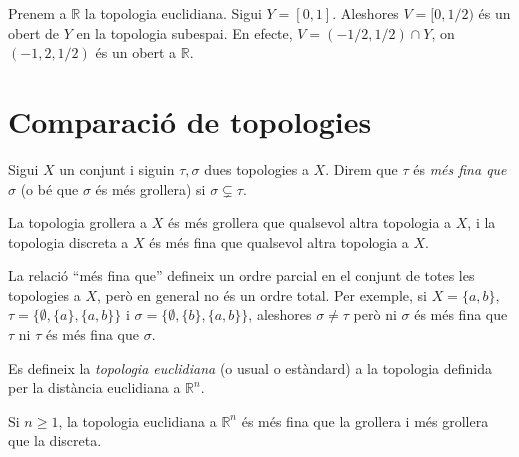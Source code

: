 \documentclass[../main.tex]{subfiles}
\begin{document}
\begin{ej}
\label{ej:topologiasubespai3} Prenem a $\mathbb{R}$ la topologia euclidiana. Sigui $Y = [0,1]$. Aleshores $V = [0,1/2)$ és un obert de $Y$ en la topologia subespai. En efecte, $V = (-1/2,1/2)\cap Y$, on $(-1,2,1/2)$ és un obert a $\mathbb{R}$.
\end{ej}

\section{Comparació de topologies}
\begin{defi}
\label{def:mesfina} Sigui $X$ un conjunt i siguin $\tau,\sigma$ dues topologies a $X$. Direm que $\tau$ és \textit{més fina que $\sigma$} (o bé que $\sigma$ és més grollera) si $\sigma\varsubsetneq\tau$.
\end{defi}

\begin{ej}
La topologia grollera a $X$ és més grollera que qualsevol altra topologia a $X$, i la topologia discreta a $X$ és més fina que qualsevol altra topologia a $X$.
\end{ej}

\begin{nota}\label{nota:ordreparcialtopologies}
La relació ``més fina que'' defineix un ordre parcial en el conjunt de totes les topologies a $X$, però en general no és un ordre total. Per exemple, si $X = \{a,b\}$, $\tau = \{\emptyset,\{a\},\{a,b\}\}$ i $\sigma = \{\emptyset,\{b\},\{a,b\}\}$, aleshores $\sigma\not=\tau$ però ni $\sigma$ és més fina que $\tau$ ni $\tau$ és més fina que $\sigma$.
\end{nota}

\begin{defi}
\label{def:topologiaeuclidiana} Es defineix la \textit{topologia euclidiana} (o usual o estàndard) a la topologia definida per la distància euclidiana a $\mathbb{R}^n$.
\end{defi}

\begin{nota}
Si $n\geq 1$, la topologia euclidiana a $\mathbb{R}^n$ és més fina que la grollera i més grollera que la discreta.
\end{nota}
\end{document}
